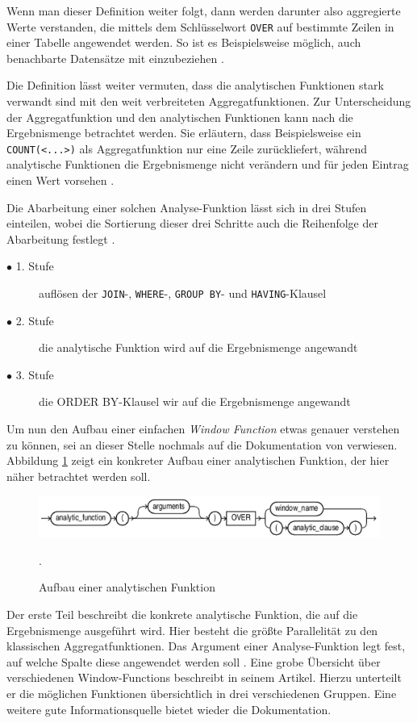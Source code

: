 Wenn man dieser Definition weiter folgt, dann werden darunter also aggregierte
Werte verstanden, die mittels dem Schlüsselwort \texttt{OVER} auf bestimmte
Zeilen in einer Tabelle angewendet werden. So ist es Beispielsweise möglich,
auch benachbarte Datensätze mit einzubeziehen \citep[vgl.][K. 7]{oracle}.

Die Definition lässt weiter vermuten, dass die analytischen Funktionen stark
verwandt sind mit den weit verbreiteten Aggregatfunktionen. Zur Unterscheidung der
Aggregatfunktion und den analytischen Funktionen kann nach \citet[S. 36]{Nuijten2023}
die Ergebnismenge betrachtet werden. Sie erläutern, dass Beispielsweise ein
\texttt{COUNT(<...>)} als Aggregatfunktion nur eine Zeile zurückliefert, während
analytische Funktionen die Ergebnismenge nicht verändern und für jeden Eintrag
einen Wert vorsehen \citep[vgl.][S. 36]{Nuijten2023}.

Die Abarbeitung einer solchen Analyse-Funktion lässt sich in drei Stufen einteilen,
wobei die Sortierung dieser drei Schritte auch die Reihenfolge der Abarbeitung
festlegt \citep[vgl.][S. 35]{Nuijten2023}.
\begin{description}
	\item[$\bullet$ 1. Stufe] auflösen der \texttt{JOIN}-, \texttt{WHERE}-, \texttt{GROUP
		BY}- und \texttt{HAVING}-Klausel

	\item[$\bullet$ 2. Stufe] die analytische Funktion wird auf die Ergebnismenge angewandt

	\item[$\bullet$ 3. Stufe] die ORDER BY-Klausel wir auf die Ergebnismenge angewandt
\end{description}
Um nun den Aufbau einer einfachen \textit{Window Function} etwas genauer verstehen
zu können, sei an dieser Stelle nochmals auf die Dokumentation von \citet{oracle}
verwiesen. Abbildung \ref{fig:aufbauAnalyticFunction} zeigt ein konkreter Aufbau
einer analytischen Funktion, der hier näher betrachtet werden soll.
\begin{figure}[h]
	\centering
	\includegraphics[scale=0.5]{img/aufbauAnalyticFunction.jpg}
	\caption{ Aufbau einer analytischen Funktion \citep[vgl.][K. 7]{oracle}}
	. \label{fig:aufbauAnalyticFunction}
\end{figure}
Der erste Teil beschreibt die konkrete analytische Funktion, die auf die Ergebnismenge
ausgeführt wird. Hier besteht die größte Parallelität zu den klassischen
Aggregatfunktionen. Das Argument einer Analyse-Funktion legt fest, auf welche
Spalte diese angewendet werden soll \citep[vgl.][S.~110]{schicker2017datenbanken}.
Eine grobe Übersicht über verschiedenen Window-Functions beschreibt \citet[]{ibrahaim23}
in seinem Artikel. Hierzu unterteilt er die möglichen Funktionen übersichtlich
in drei verschiedenen Gruppen. Eine weitere gute Informationsquelle bietet wieder
die \citet{oracle} Dokumentation.

